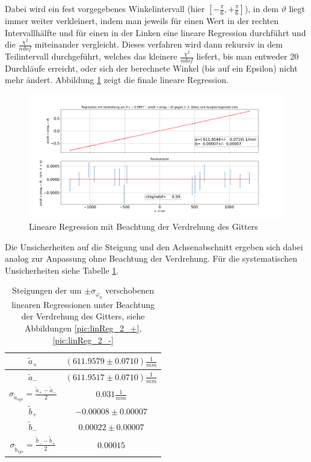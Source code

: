 \documentclass[a4paper, 11pt]{article}
\begin{document}
Dabei wird ein fest vorgegebenes Winkelintervall (hier $\left[ -\frac{\pi}{6}, +\frac{\pi}{6}\right]$), in dem $\vartheta$ liegt immer weiter verkleinert, indem man jeweils für einen Wert in der rechten Intervallhälfte und für einen in der Linken eine lineare Regression durchführt und die $\frac{\chi^2}{ndof}$ miteinander vergleicht. Dieses verfahren wird dann rekursiv in dem Teilintervall durchgeführt, welches das kleinere $\frac{\chi^2}{ndof}$ liefert, bis man entweder 20 Durchläufe erreicht, oder sich der berechnete Winkel (bis auf ein Epsilon) nicht mehr ändert.
Abbildung \ref{pic:linReg_2} zeigt die finale lineare Regression.

\begin{figure}[H]
	\hskip-2.5cm
	\includegraphics[scale=0.45]{./Bilder/Gitter_Regression_mit_Verdrehung.png}
	\caption{Lineare Regression mit Beachtung der Verdrehung des Gitters}
	\label{pic:linReg_2}	
\end{figure}

Die Unsicherheiten auf die Steigung und den Achsenabschnitt ergeben sich dabei analog zur Anpassung ohne Beachtung der Verdrehung. Für die systematischen Unsicherheiten siehe Tabelle \ref{table: aSys_2}.

\begin{table}[H]
	\renewcommand{\arraystretch}{1.5}
	\large
	\centering
	\begin{tabular}{|c|c|}
		\hline
		$\tilde{a}_+$	&	$(611.9579 \pm 0.0710) \frac{1}{mm}$ \\
		\hline
		$\tilde{a}_-$	&	$(611.9517 \pm 0.0710) \frac{1}{mm}$ \\
		\hline
		$\sigma_{\tilde{a}_{sys}} = \frac{\tilde{a}_+ - \tilde{a}_-}{2}$	&	$ 0.031 \frac{1}{mm} $ \\
		\hline
		$\tilde{b}_+$	&	$-0.00008 \pm 0.00007$ \\
		\hline
		$\tilde{b}_-$	&	$0.00022 \pm 0.00007$ \\
		\hline
		$\sigma_{\tilde{b}_{sys}} = \frac{\tilde{b}_- - \tilde{b}_+}{2}$	&	$ 0.00015 $ \\
		\hline
	\end{tabular}
	\caption{Steigungen der um $\pm \sigma_{\varphi_0}$ verschobenen linearen Regressionen unter Beachtung der Verdrehung des Gitters, siehe Abbildungen \ref{pic:linReg_2_+}, \ref{pic:linReg_2_-}}
	\label{table: aSys_2}
\end{table}
\end{document}
